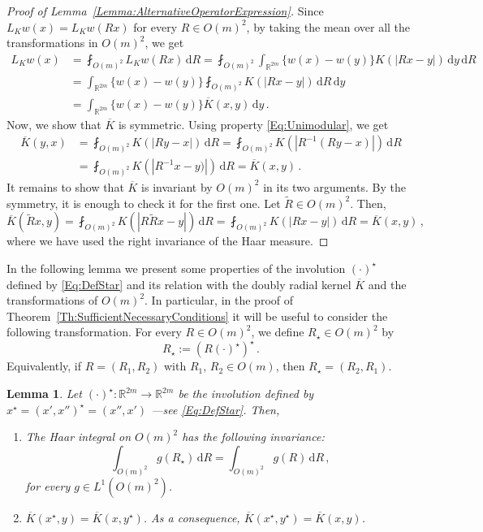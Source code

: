 \documentclass[12pt,reqno]{amsart}
\newtheorem{lemma}[theorem]{Lemma}
\theoremstyle{definition}
\theoremstyle{remark}
\newcommand{\con}[1]{\mathbb{#1}}
\newcommand{\R}{\con{R}} %
\renewcommand{\d}{\,\mathrm{d}} %
\newcommand{\average}{\fint}
\numberwithin{equation}{section}
\begin{document}
	\begin{proof}[Proof of Lemma~\ref{Lemma:AlternativeOperatorExpression}]
		Since $L_K w (x) = L_K w (Rx)$ for every $R\in O(m)^2$, by taking the mean over all the transformations in $O(m)^2$, we get
		\begin{align*}
		L_K w(x) &= \average_{O(m)^2} L_K w(Rx)\d R =  \average_{O(m)^2} \int_{\R^{2m}} \{w(x) - w(y)\}K(|Rx - y|) \d y \d R\\
		&= \int_{\R^{2m}} \{w(x) - w(y)\}  \average_{O(m)^2} K(|Rx - y|) \d R  \d y \\
		&= \int_{\R^{2m}} \{w(x) - w(y)\}  \overline{K}(x,y) \d y\,.
		\end{align*}
		Now, we show that $\overline{K}$ is symmetric. Using property \eqref{Eq:Unimodular}, we get
		\begin{align*}
		\overline{K}(y,x) &= \average_{O(m)^2} K(|R y - x|)\d R = \average_{O(m)^2} K(|R^{-1} (R y - x)|)\d R \\
		&= \average_{O(m)^2} K(|R^{-1}x-y)|)\d R = \overline{K}(x,y)\,.
		\end{align*}
		It remains to show that
		$\overline{K}$ is invariant by $O(m)^2$ in its two arguments. By the symmetry, it is enough to
		check it for the first one. Let $\tilde{R} \in O(m)^2$. Then,
		$$
		\overline{K} (\tilde{R}x, y) = \average_{O(m)^2} K(|R \tilde{R} x - y|)\d R  = \average_{O(m)^2} K(|R x - y|)\d R = \overline{K} (x, y)\,,
		$$
		where we have used the right invariance of the Haar measure.
	\end{proof}
	
	
	
	In the following lemma we present some properties of the involution $(\cdot)^\star$ defined by \eqref{Eq:DefStar} and its relation with the doubly radial kernel $\overline{K}$ and the transformations of $O(m)^2$. In particular, in the proof of Theorem~\ref{Th:SufficientNecessaryConditions} it will be useful to consider the following transformation. For every $R\in O(m)^2$, we define  $R_\star\in O(m)^2$ by 
	\begin{equation}
	\label{Eq:DefRStar}
	R_\star := (R(\cdot)^\star)^\star\,.
	\end{equation}
	Equivalently, if $R = (R_1, R_2)$ with $R_1$, $R_2 \in O(m)$, then $R_\star = (R_2, R_1)$.
	
	\begin{lemma}
		\label{Lemma:PropertiesStar}
		Let $(\cdot)^\star: \R^{2m} \to \R^{2m}$ be the involution defined by $x^\star = (x',x'')^\star = (x'', x')$
		---see \eqref{Eq:DefStar}.
		Then,
		\begin{enumerate}
			\item
			The Haar integral on $O(m)^2$ has the following invariance:
			\begin{equation}
			\label{Eq:InvarianceByStar}
			\int_{O(m)^2} g(R_\star) \d R = \int_{O(m)^2} g(R) \d R \,,
			\end{equation}
			for every $g \in L^1(O(m)^2)$.
			\item $\overline{K}(x^\star,y) = \overline{K} (x,y^\star)$. As a consequence, $\overline{K}(x^\star,y^\star) = \overline{K} (x,y)$.
		\end{enumerate}
	\end{lemma}
	
\end{document}
